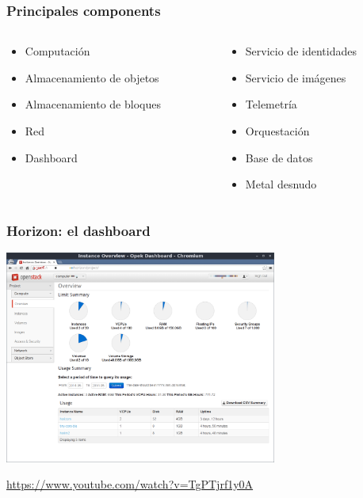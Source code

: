 \begin{frame}
\frametitle{Principales components}

\begin{columns}[T]
\begin{column}{.45\textwidth}
{\Large
\begin{itemize}
\item Computación
\item Almacenamiento de objetos
\item Almacenamiento de bloques
\item Red
\item Dashboard
\end{itemize}
}
\end{column}%
\hfill%
\begin{column}{.45\textwidth}
{\Large
\begin{itemize}
\item Servicio de identidades
\item Servicio de imágenes
\item Telemetría
\item Orquestación
\item Base de datos
\item Metal desnudo
\end{itemize}
}
\end{column}%
\end{columns}

\end{frame}

\begin{frame}
\frametitle{Horizon: el dashboard}

\includegraphics[height=7cm]{figs/openstack-screenshot}

\begin{flushright}
\url{https://www.youtube.com/watch?v=TgPTjrf1y0A}
\end{flushright}

\end{frame}

